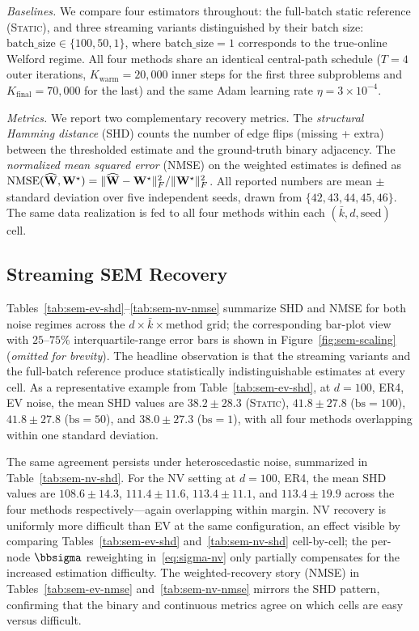 \documentclass[journal,twoside]{IEEEtran}
\begin{document}
\textit{Baselines.} We compare four estimators throughout: the
full-batch static reference (\textsc{Static}), and three streaming
variants distinguished by their batch size:
$\mathrm{batch\_size} \in \{100, 50, 1\}$, where
$\mathrm{batch\_size} = 1$ corresponds to the true-online Welford
regime. All four methods share an identical central-path
schedule ($T = 4$ outer iterations, $K_\mathrm{warm} = 20{,}000$ inner
steps for the first three subproblems and $K_\mathrm{final} = 70{,}000$
for the last) and the same Adam learning rate $\eta = 3 \times 10^{-4}$.

\textit{Metrics.} We report two complementary recovery metrics. The
\emph{structural Hamming distance} (SHD) counts the number of edge
flips (missing + extra) between the thresholded estimate and the
ground-truth binary adjacency. The \emph{normalized mean squared
error} (NMSE) on the weighted estimates is defined as
$\mathrm{NMSE}(\widehat{{\mathbf W}}, {\mathbf W}^\star) =
\|\widehat{{\mathbf W}} - {\mathbf W}^\star\|_F^2 /
\|{\mathbf W}^\star\|_F^2$. All reported numbers are mean $\pm$ standard
deviation over five independent seeds, drawn from
$\{42, 43, 44, 45, 46\}$. The same data realization is fed to all four
methods within each $(\bar{k}, d, \mathrm{seed})$ cell.

\subsection{Streaming SEM Recovery}
\label{sec:exp-sem}
Tables~\ref{tab:sem-ev-shd}--\ref{tab:sem-nv-nmse} summarize SHD and
NMSE for both noise regimes across the $d \times \bar{k} \times
\text{method}$ grid; the corresponding bar-plot view with $25$--$75\%$
interquartile-range error bars is shown in Figure~\ref{fig:sem-scaling}
(\textit{omitted for brevity}). The headline observation is that the
streaming variants and the full-batch reference produce statistically
indistinguishable estimates at every cell. As a representative example
from Table~\ref{tab:sem-ev-shd}, at $d = 100$, ER4, EV noise, the mean
SHD values are $38.2 \pm 28.3$ (\textsc{Static}), $41.8 \pm 27.8$
($\mathrm{bs} = 100$), $41.8 \pm 27.8$ ($\mathrm{bs} = 50$), and
$38.0 \pm 27.3$ ($\mathrm{bs} = 1$), with all four methods overlapping
within one standard deviation.

The same agreement persists under heteroscedastic noise, summarized in
Table~\ref{tab:sem-nv-shd}. For the NV setting at $d = 100$, ER4, the
mean SHD values are $108.6 \pm 14.3$, $111.4 \pm 11.6$, $113.4 \pm 11.1$,
and $113.4 \pm 19.9$ across the four methods respectively---again
overlapping within margin. NV recovery is uniformly more difficult
than EV at the same configuration, an effect visible by comparing
Tables~\ref{tab:sem-ev-shd} and~\ref{tab:sem-nv-shd} cell-by-cell;
the per-node $\bbsigma$ reweighting in~\eqref{eq:sigma-nv} only
partially compensates for the increased estimation difficulty. The
weighted-recovery story (NMSE) in
Tables~\ref{tab:sem-ev-nmse} and~\ref{tab:sem-nv-nmse} mirrors the
SHD pattern, confirming that the binary and continuous metrics agree
on which cells are easy versus difficult.
\end{document}
